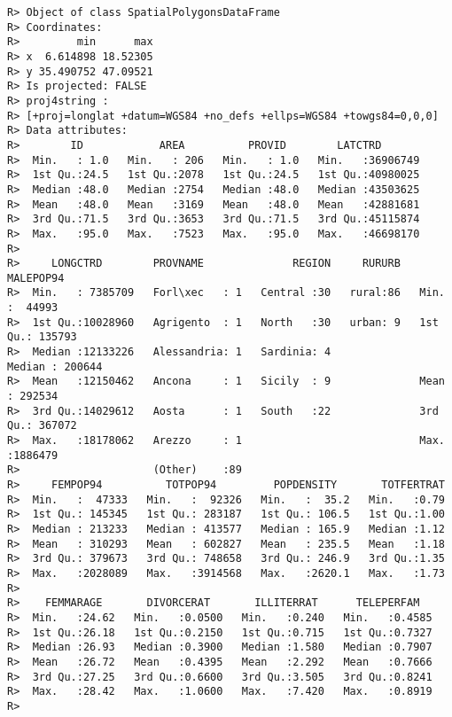 \documentclass[
]{article}
\begin{document}
\begin{verbatim}
R> Object of class SpatialPolygonsDataFrame
R> Coordinates:
R>         min      max
R> x  6.614898 18.52305
R> y 35.490752 47.09521
R> Is projected: FALSE 
R> proj4string :
R> [+proj=longlat +datum=WGS84 +no_defs +ellps=WGS84 +towgs84=0,0,0]
R> Data attributes:
R>        ID            AREA          PROVID        LATCTRD        
R>  Min.   : 1.0   Min.   : 206   Min.   : 1.0   Min.   :36906749  
R>  1st Qu.:24.5   1st Qu.:2078   1st Qu.:24.5   1st Qu.:40980025  
R>  Median :48.0   Median :2754   Median :48.0   Median :43503625  
R>  Mean   :48.0   Mean   :3169   Mean   :48.0   Mean   :42881681  
R>  3rd Qu.:71.5   3rd Qu.:3653   3rd Qu.:71.5   3rd Qu.:45115874  
R>  Max.   :95.0   Max.   :7523   Max.   :95.0   Max.   :46698170  
R>                                                                 
R>     LONGCTRD        PROVNAME              REGION     RURURB     MALEPOP94      
R>  Min.   : 7385709   Forl\xec   : 1   Central :30   rural:86   Min.   :  44993  
R>  1st Qu.:10028960   Agrigento  : 1   North   :30   urban: 9   1st Qu.: 135793  
R>  Median :12133226   Alessandria: 1   Sardinia: 4              Median : 200644  
R>  Mean   :12150462   Ancona     : 1   Sicily  : 9              Mean   : 292534  
R>  3rd Qu.:14029612   Aosta      : 1   South   :22              3rd Qu.: 367072  
R>  Max.   :18178062   Arezzo     : 1                            Max.   :1886479  
R>                     (Other)    :89                                             
R>     FEMPOP94          TOTPOP94         POPDENSITY       TOTFERTRAT  
R>  Min.   :  47333   Min.   :  92326   Min.   :  35.2   Min.   :0.79  
R>  1st Qu.: 145345   1st Qu.: 283187   1st Qu.: 106.5   1st Qu.:1.00  
R>  Median : 213233   Median : 413577   Median : 165.9   Median :1.12  
R>  Mean   : 310293   Mean   : 602827   Mean   : 235.5   Mean   :1.18  
R>  3rd Qu.: 379673   3rd Qu.: 748658   3rd Qu.: 246.9   3rd Qu.:1.35  
R>  Max.   :2028089   Max.   :3914568   Max.   :2620.1   Max.   :1.73  
R>                                                                     
R>    FEMMARAGE       DIVORCERAT       ILLITERRAT      TELEPERFAM    
R>  Min.   :24.62   Min.   :0.0500   Min.   :0.240   Min.   :0.4585  
R>  1st Qu.:26.18   1st Qu.:0.2150   1st Qu.:0.715   1st Qu.:0.7327  
R>  Median :26.93   Median :0.3900   Median :1.580   Median :0.7907  
R>  Mean   :26.72   Mean   :0.4395   Mean   :2.292   Mean   :0.7666  
R>  3rd Qu.:27.25   3rd Qu.:0.6600   3rd Qu.:3.505   3rd Qu.:0.8241  
R>  Max.   :28.42   Max.   :1.0600   Max.   :7.420   Max.   :0.8919  
R> 
\end{verbatim}
\end{document}
